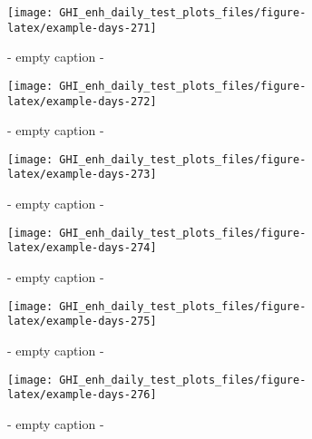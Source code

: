 \documentclass[
  10pt,
  a4paper,oneside]{article}
\begin{document}
\begin{figure}[H]

{\centering \texttt{[image: GHI\_enh\_daily\_test\_plots\_files/figure-latex/example-days-271]} 

}

\caption{ - empty caption - }\label{fig:example-days-271}
\end{figure}

\begin{figure}[H]

{\centering \texttt{[image: GHI\_enh\_daily\_test\_plots\_files/figure-latex/example-days-272]} 

}

\caption{ - empty caption - }\label{fig:example-days-272}
\end{figure}

\begin{figure}[H]

{\centering \texttt{[image: GHI\_enh\_daily\_test\_plots\_files/figure-latex/example-days-273]} 

}

\caption{ - empty caption - }\label{fig:example-days-273}
\end{figure}

\begin{figure}[H]

{\centering \texttt{[image: GHI\_enh\_daily\_test\_plots\_files/figure-latex/example-days-274]} 

}

\caption{ - empty caption - }\label{fig:example-days-274}
\end{figure}

\begin{figure}[H]

{\centering \texttt{[image: GHI\_enh\_daily\_test\_plots\_files/figure-latex/example-days-275]} 

}

\caption{ - empty caption - }\label{fig:example-days-275}
\end{figure}

\begin{figure}[H]

{\centering \texttt{[image: GHI\_enh\_daily\_test\_plots\_files/figure-latex/example-days-276]} 

}

\caption{ - empty caption - }\label{fig:example-days-276}
\end{figure}
\end{document}
